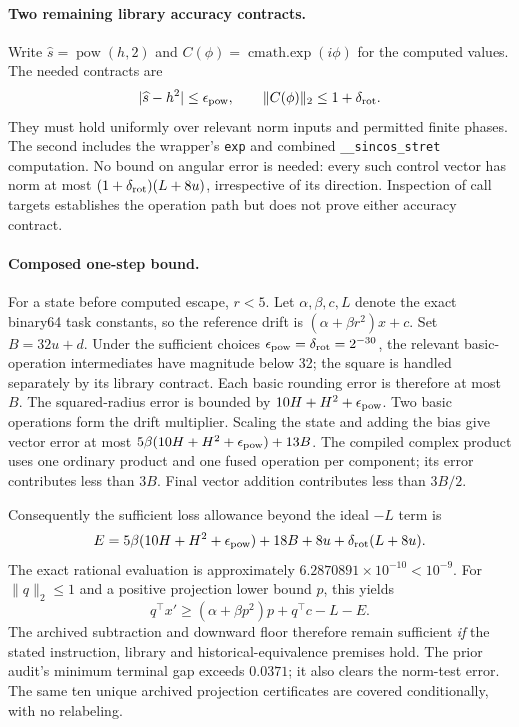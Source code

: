 \paragraph{Two remaining library accuracy contracts.}
Write $\widehat s=\operatorname{pow}(h,2)$ and
$C(\phi)=\operatorname{cmath.exp}(i\phi)$ for the computed values.
The needed contracts are
\begin{equation}
 |\widehat s-h^2|\leq\epsilon_{\rm pow},\qquad
 \|C(\phi)\|_2\leq1+\delta_{\rm rot}.
 \label{eq:remaining-contracts}
\end{equation}
They must hold uniformly over relevant norm inputs and permitted finite
phases. The second includes the wrapper's \texttt{exp} and combined
\texttt{\_\_sincos\_stret} computation. No bound on angular error is
needed: every such control vector has norm at most
$(1+\delta_{\rm rot})(L+8u)$, irrespective of its direction.
Inspection of call targets establishes the operation path but does not
prove either accuracy contract.

\paragraph{Composed one-step bound.}
For a state before computed escape, $r<5$. Let $\alpha,\beta,c,L$
denote the exact binary64 task constants, so the reference drift is
$(\alpha+\beta r^2)x+c$. Set $B=32u+d$. Under the sufficient choices
$\epsilon_{\rm pow}=\delta_{\rm rot}=2^{-30}$, the relevant basic-operation
intermediates have magnitude below 32; the square is handled separately
by its library contract. Each basic rounding error is therefore at most
$B$. The squared-radius error is bounded by
$10H+H^2+\epsilon_{\rm pow}$. Two basic operations form the drift
multiplier. Scaling the state and adding the bias give vector error
at most $5\beta(10H+H^2+\epsilon_{\rm pow})+13B$.
The compiled complex product uses one ordinary product and one fused
operation per component; its error contributes less than $3B$.
Final vector addition contributes less than $3B/2$.

Consequently the sufficient loss allowance beyond the ideal $-L$ term is
\begin{equation}
 E=5\beta(10H+H^2+\epsilon_{\rm pow})
    +18B+8u+\delta_{\rm rot}(L+8u).
 \label{eq:composed-error}
\end{equation}
The exact rational evaluation is approximately
$6.2870891\times10^{-10}<10^{-9}$. For $\|q\|_2\leq1$ and a positive
projection lower bound $p$, this yields
\[
 q^\top x'\geq(\alpha+\beta p^2)p+q^\top c-L-E.
\]
The archived subtraction and downward floor therefore remain sufficient
\emph{if} the stated instruction, library and historical-equivalence
premises hold. The prior audit's minimum terminal gap exceeds $0.0371$;
it also clears the norm-test error. The same ten unique archived
projection certificates are covered conditionally, with no relabeling.

